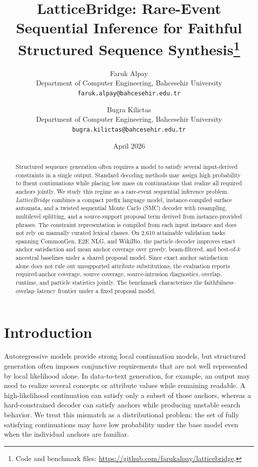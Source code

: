 \documentclass[11pt]{article}
\title{\textbf{LatticeBridge: Rare-Event Sequential Inference for Faithful Structured Sequence Synthesis}\thanks{Code and benchmark files: \url{https://github.com/farukalpay/latticebridge}.}}
\author{
Faruk Alpay\\
\normalsize Department of Computer Engineering, Bahcesehir University\\
\normalsize \texttt{faruk.alpay@bahcesehir.edu.tr}
\and
Bugra Kilictas\\
\normalsize Department of Computer Engineering, Bahcesehir University\\
\normalsize \texttt{bugra.kilictas@bahcesehir.edu.tr}
}
\date{April 2026}
\begin{document}
\maketitle

\begin{abstract}
Structured sequence generation often requires a model to satisfy several input-derived constraints in a single output. Standard decoding methods may assign high probability to fluent continuations while placing low mass on continuations that realize all required anchors jointly. We study this regime as a rare-event sequential inference problem. \emph{LatticeBridge} combines a compact prefix language model, instance-compiled surface automata, and a twisted sequential Monte Carlo (SMC) decoder with resampling, multilevel splitting, and a source-support proposal term derived from instance-provided phrases. The constraint representation is compiled from each input instance and does not rely on manually curated lexical classes. On 2{,}610 attainable validation tasks spanning CommonGen, E2E NLG, and WikiBio, the particle decoder improves exact anchor satisfaction and mean anchor coverage over greedy, beam-filtered, and best-of-$k$ ancestral baselines under a shared proposal model. Since exact anchor satisfaction alone does not rule out unsupported attribute substitutions, the evaluation reports required-anchor coverage, source coverage, source-intrusion diagnostics, overlap, runtime, and particle statistics jointly. The benchmark characterizes the faithfulness--overlap--latency frontier under a fixed proposal model.
\end{abstract}

\section{Introduction}
Autoregressive models provide strong local continuation models, but structured generation often imposes conjunctive requirements that are not well represented by local likelihood alone. In data-to-text generation, for example, an output may need to realize several concepts or attribute values while remaining readable. A high-likelihood continuation can satisfy only a subset of those anchors, whereas a hard-constrained decoder can satisfy anchors while producing unstable search behavior. We treat this mismatch as a distributional problem: the set of fully satisfying continuations may have low probability under the base model even when the individual anchors are familiar.
\end{document}
